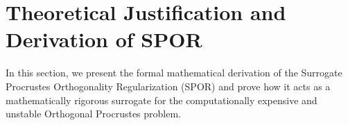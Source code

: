 \documentclass{article}
\theoremstyle{plain}
\theoremstyle{definition}
\theoremstyle{remark}
\begin{document}



\newpage
\appendix
\onecolumn
\section{Theoretical Justification and Derivation of SPOR}
\label{appendix:proof}

In this section, we present the formal mathematical derivation of the Surrogate Procrustes Orthogonality Regularization (SPOR) and prove how it acts as a mathematically rigorous surrogate for the computationally expensive and unstable Orthogonal Procrustes problem.
\end{document}
